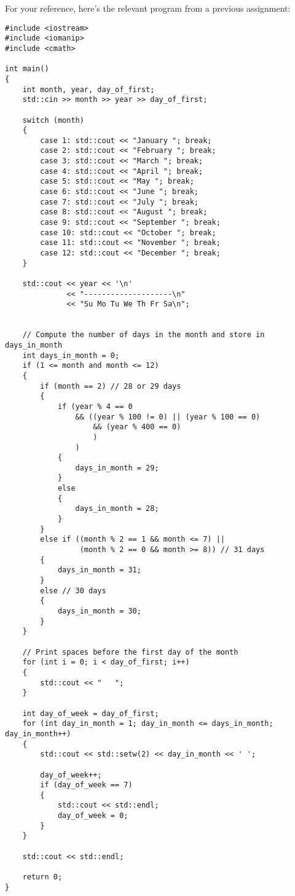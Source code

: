 For your reference, here's the relevant program from a previous assignment:

{\small
\begin{Verbatim}[frame=single]
#include <iostream>
#include <iomanip>
#include <cmath>

int main()
{
    int month, year, day_of_first;
    std::cin >> month >> year >> day_of_first;

    switch (month)
    {
        case 1: std::cout << "January "; break;
        case 2: std::cout << "February "; break;
        case 3: std::cout << "March "; break;
        case 4: std::cout << "April "; break;
        case 5: std::cout << "May "; break;
        case 6: std::cout << "June "; break;
        case 7: std::cout << "July "; break;
        case 8: std::cout << "August "; break;
        case 9: std::cout << "September "; break;
        case 10: std::cout << "October "; break;
        case 11: std::cout << "November "; break;
        case 12: std::cout << "December "; break;
    }

    std::cout << year << '\n'
              << "--------------------\n"
              << "Su Mo Tu We Th Fr Sa\n";


    // Compute the number of days in the month and store in days_in_month
    int days_in_month = 0;
    if (1 <= month and month <= 12)
    {
        if (month == 2) // 28 or 29 days
        {
            if (year % 4 == 0 
                && ((year % 100 != 0) || (year % 100 == 0) 
                    && (year % 400 == 0)
                    )
                )
            {
                days_in_month = 29;
            }
            else
            {
                days_in_month = 28;
            }
        }
        else if ((month % 2 == 1 && month <= 7) || 
                 (month % 2 == 0 && month >= 8)) // 31 days
        {
            days_in_month = 31;
        }
        else // 30 days
        {  
            days_in_month = 30;
        }
    }

    // Print spaces before the first day of the month
    for (int i = 0; i < day_of_first; i++)
    {
        std::cout << "   ";
    }

    int day_of_week = day_of_first;
    for (int day_in_month = 1; day_in_month <= days_in_month; day_in_month++)
    {
        std::cout << std::setw(2) << day_in_month << ' ';
        
        day_of_week++;
        if (day_of_week == 7)
        {
            std::cout << std::endl;
            day_of_week = 0;
        }
    }
    
    std::cout << std::endl;
    
    return 0;
}
\end{Verbatim}
}

